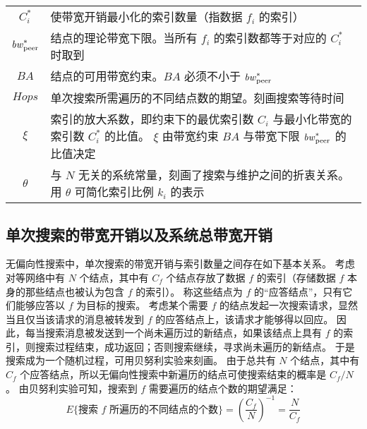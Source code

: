 \documentclass{thuthesis}
\begin{document}
\begin{table}[htb]
\begin{tabular}{cp{}}
    $C_i^*$                             & 使带宽开销最小化的索引数量（指数据 $f_i$ 的索引）                                                \\
    $\mathit{bw}_{\text{peer}}^*$                         & 结点的理论带宽下限。当所有 $f_i$ 的索引数都等于对应的 $C_i^*$ 时取到                             \\
    $\mathit{BA}$                       & 结点的可用带宽约束。$\mathit{BA}$ 必须不小于 $\mathit{bw}_{\text{peer}}^*$                                         \\
    $\mathit{Hops}$                     & 单次搜索所需遍历的不同结点数的期望。刻画搜索等待时间                                             \\
    $\xi$                               & 索引的放大系数，即约束下的最优索引数 $C_i$ 与最小化带宽的索引数 $C_i^*$ 的比值。
                                          $\xi$ 由带宽约束 $\mathit{BA}$ 与带宽下限 $\mathit{bw}_{\text{peer}}^*$ 的比值决定                                 \\
    $\theta$                            & 与 $N$ 无关的系统常量，刻画了搜索与维护之间的折衷关系。用 $\theta$ 可简化索引比例 $k_i$ 的表示   \\
    \bottomrule
  \end{tabular}
\end{table}


\subsection{单次搜索的带宽开销以及系统总带宽开销}

无偏向性搜索中，单次搜索的带宽开销与索引数量之间存在如下基本关系。
考虑对等网络中有 $N$ 个结点，其中有 $C_f$ 个结点存放了数据 $f$ 的索引（存储数据 $f$ 本身的那些结点也被认为包含 $f$ 的索引）。
称这些结点为 $f$ 的“应答结点”，只有它们能够应答以 $f$ 为目标的搜索。
考虑某个需要 $f$ 的结点发起一次搜索请求，显然当且仅当该请求的消息被转发到 $f$ 的应答结点上，该请求才能够得以回应。
因此，每当搜索消息被发送到一个尚未遍历过的新结点，如果该结点上具有 $f$ 的索引，则搜索过程结束，成功返回；否则搜索继续，寻求尚未遍历的新结点。
于是搜索成为一个随机过程，可用贝努利实验来刻画。
由于总共有 $N$ 个结点，其中有 $C_f$ 个应答结点，所以无偏向性搜索中新遍历的结点可使搜索结束的概率是 $C_f / N$。
由贝努利实验可知，搜索到 $f$ 需要遍历的结点个数的期望满足：
\begin{equation}
  E \{\text{搜索 $f$ 所遍历的不同结点的个数}\} = \left(\frac{C_f}{N}\right)^{-1} = \frac{N}{C_f}
\end{equation}
\end{document}
